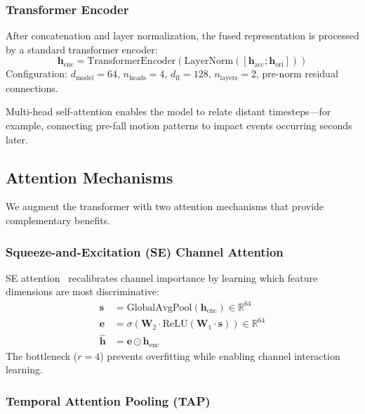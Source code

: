 \subsubsection{Transformer Encoder}

After concatenation and layer normalization, the fused representation is processed by a standard transformer encoder:
\begin{equation}
\mathbf{h}_\text{enc} = \text{TransformerEncoder}(\text{LayerNorm}([\mathbf{h}_\text{acc}; \mathbf{h}_\text{ori}]))
\end{equation}
Configuration: $d_\text{model}=64$, $n_\text{heads}=4$, $d_\text{ff}=128$, $n_\text{layers}=2$, pre-norm residual connections.

Multi-head self-attention enables the model to relate distant timesteps---for example, connecting pre-fall motion patterns to impact events occurring seconds later.

\subsection{Attention Mechanisms}
\label{subsec:attention}

We augment the transformer with two attention mechanisms that provide complementary benefits.

\subsubsection{Squeeze-and-Excitation (SE) Channel Attention}

SE attention~\cite{hu2018squeeze} recalibrates channel importance by learning which feature dimensions are most discriminative:
\begin{align}
\mathbf{s} &= \text{GlobalAvgPool}(\mathbf{h}_\text{enc}) \in \mathbb{R}^{64} \\
\mathbf{e} &= \sigma(\mathbf{W}_2 \cdot \text{ReLU}(\mathbf{W}_1 \cdot \mathbf{s})) \in \mathbb{R}^{64} \\
\hat{\mathbf{h}} &= \mathbf{e} \odot \mathbf{h}_\text{enc}
\end{align}
The bottleneck ($r=4$) prevents overfitting while enabling channel interaction learning.

\subsubsection{Temporal Attention Pooling (TAP)}

